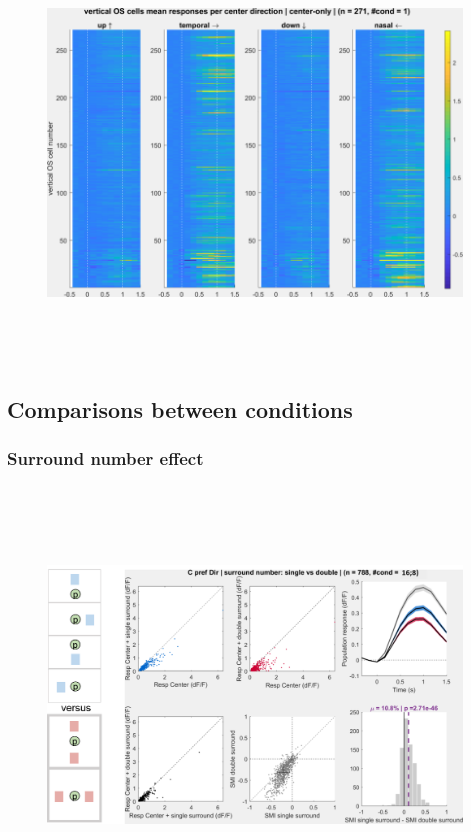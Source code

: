 \begin{figure}[H] \centering \includegraphics[width=11cm,height=11cm,keepaspectratio]{Figures/7.Results/population/sel/12_popPlots_vertOS_centerOnly.png} 
\end{figure}

\subsection{Comparisons between conditions}
\label{sec:comparisons}

\subsubsection{Surround number effect}

\begin{figure}[H] \centering \includegraphics[width=11cm,height=11cm,keepaspectratio]{Figures/7.Results/population/sel/diagrams/1.png} 
\end{figure}

